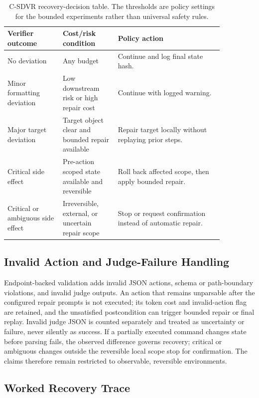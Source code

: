 \documentclass[pdflatex,sn-apa]{sn-jnl}
\begin{document}
\begin{table}[htbp]
\centering
\caption{C-SDVR recovery-decision table. The thresholds are policy settings for the bounded experiments rather than universal safety rules.}
\label{tab:decision}
\small
\begin{tabular}{p{0.22\linewidth}p{0.22\linewidth}p{0.42\linewidth}}
\toprule
Verifier outcome & Cost/risk condition & Policy action \\
\midrule
No deviation & Any budget & Continue and log final state hash. \\
Minor formatting deviation & Low downstream risk or high repair cost & Continue with logged warning. \\
Major target deviation & Target object clear and bounded repair available & Repair target locally without replaying prior steps. \\
Critical side effect & Pre-action scoped state available and reversible & Roll back affected scope, then apply bounded repair. \\
Critical or ambiguous side effect & Irreversible, external, or uncertain repair scope & Stop or request confirmation instead of automatic repair. \\
\bottomrule
\end{tabular}
\end{table}

\subsection{Invalid Action and Judge-Failure Handling}

Endpoint-backed validation adds invalid JSON actions, schema or path-boundary violations, and invalid judge outputs. An action that remains unparsable after the configured repair prompts is not executed; its token cost and invalid-action flag are retained, and the unsatisfied postcondition can trigger bounded repair or final replay. Invalid judge JSON is counted separately and treated as uncertainty or failure, never silently as success. If a partially executed command changes state before parsing fails, the observed difference governs recovery; critical or ambiguous changes outside the reversible local scope stop for confirmation. The claims therefore remain restricted to observable, reversible environments.

\subsection{Worked Recovery Trace}
\end{document}
